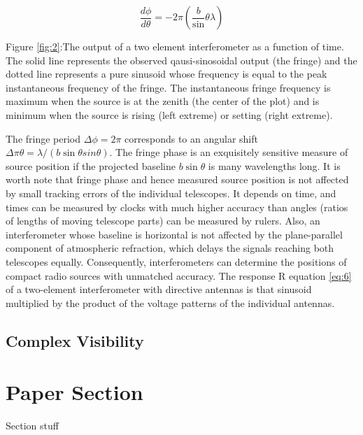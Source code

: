 {\begin{equation}
\frac{d\phi}{d\theta}=-2\pi\left(\frac b\sin{\theta}{\lambda}\right) \label{eq:9}
\end{equation}


Figure \ref{fig:2}:The output of a two element interferometer as a function of time. The solid
line represents the observed qausi-sinosoidal output (the fringe) and the dotted line represents a pure sinusoid whose frequency is equal to the peak instantaneous frequency of the fringe. The instantaneous fringe frequency is maximum when the source is at the zenith (the center of the plot) and is minimum when the source is rising (left extreme) or setting (right extreme).



The fringe period \(\Delta\phi=2\pi\) corresponds to an angular shift \(\Delta \pi\theta =\lambda/(b\sin{\theta}sin \theta)\). The fringe phase is an exquisitely sensitive measure of source position if the projected baseline \(b\sin{\theta}\) is many wavelengths long. It is worth note that fringe phase and hence measured source position is not affected by small tracking errors of the individual telescopes. It depends on time, and times can be measured by clocks with much higher accuracy than angles (ratios of lengths of moving telescope parts) can be measured by rulers. Also, an interferometer whose baseline is horizontal is not affected by the plane-parallel component of atmospheric refraction, which delays the signals reaching both telescopes equally. Consequently, interferometers can determine the positions of compact radio sources with unmatched accuracy. The response R equation \ref{eq:6} of a two-element interferometer with directive antennas is that sinusoid multiplied by the product of the voltage patterns of the individual antennas.

\subsection{Complex Visibility}























\section{Paper Section}
Section stuff

}
